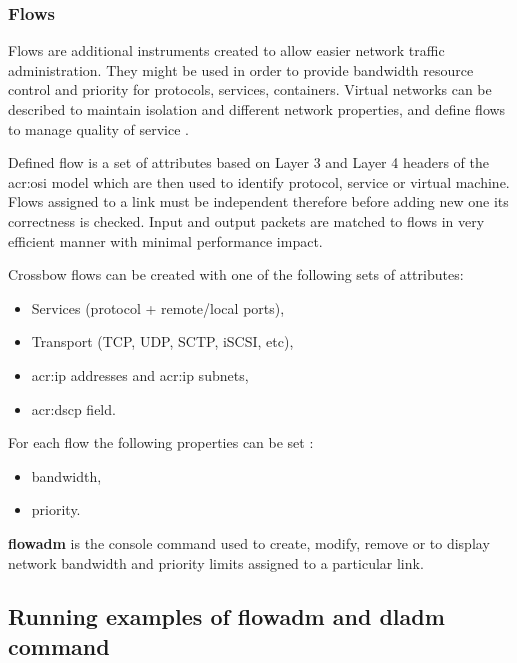 \documentclass[11pt,openany]{book}
\begin{document}
        \subsubsection{Flows}

          Flows are additional instruments created to allow easier network traffic administration. They might be used in
          order to provide bandwidth resource control and priority for protocols, services, containers. Virtual networks
          can be described to maintain isolation and different network properties, and define flows to manage quality of
          service \cite{network_virtualization}.

          Defined flow is a set of attributes based on Layer 3 and Layer 4 headers of the \gls{acr:osi} model which are
          then used to identify protocol, service or virtual machine. Flows assigned to a link must be independent
          therefore before adding new one its correctness is checked. Input and output packets are matched to flows in
          very efficient manner with minimal performance impact.

          \medskip

          Crossbow flows can be created with one of the following sets of attributes:

          \begin{itemize}
            \item Services (protocol + remote/local ports),
            \item Transport (TCP, UDP, SCTP, iSCSI, etc),
            \item \gls{acr:ip} addresses and \gls{acr:ip} subnets,
            \item \gls{acr:dscp} field.
          \end{itemize}

          For each flow the following properties can be set \cite{flows2}: 

          \begin{itemize}
            \item bandwidth,
            \item priority.
          \end{itemize}

          \textbf{flowadm} is the console command used to create, modify, remove or to display network bandwidth and
          priority limits assigned to a particular link. 


      \subsection{Running examples of flowadm and dladm command}
\end{document}
